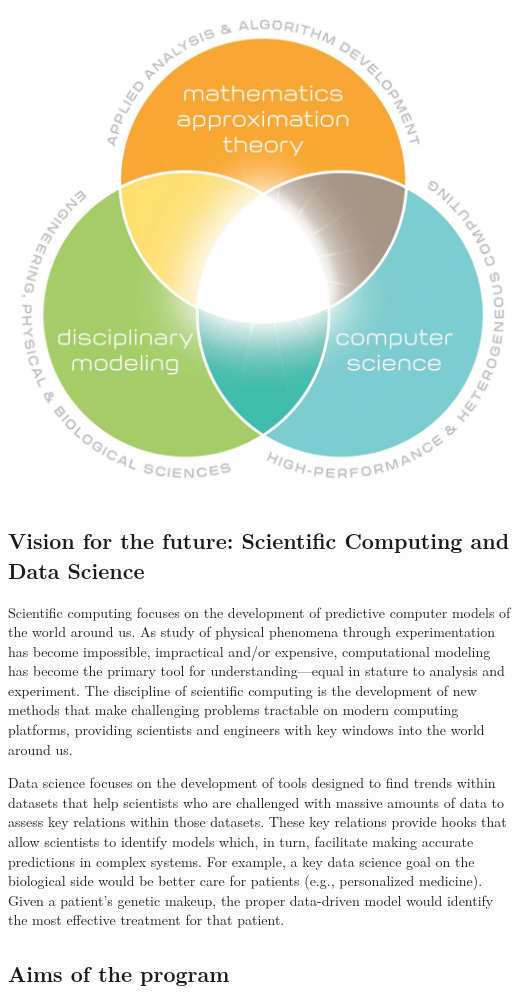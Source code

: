 \documentclass[%
oneside,                 %
final,                   %
10pt]{article}
\begin{document}
\centerline{\includegraphics[width=0.6\linewidth]{figslides/cs.jpg}}

\vspace{6mm}

\subsection{Vision for the future: Scientific Computing and Data Science}

Scientific computing focuses on the development of predictive computer
models of the world around us. As study of physical phenomena through
experimentation has become impossible, impractical and/or expensive,
computational modeling has become the primary tool for
understanding—equal in stature to analysis and experiment. 
The discipline of scientific computing
is the development of new methods that make challenging problems
tractable on modern computing platforms, providing scientists and
engineers with key windows into the world around us.

Data science focuses on the development of tools designed to find
trends within datasets that help scientists who are challenged with
massive amounts of data to assess key relations within those
datasets. These key relations provide hooks that allow scientists to
identify models which, in turn, facilitate making accurate predictions
in complex systems. For example, a key data science goal on the
biological side would be better care for patients (e.g., personalized
medicine). Given a patient’s genetic makeup, the proper data-driven
model would identify the most effective treatment for that patient.

\subsection{Aims of the program}
\end{document}
